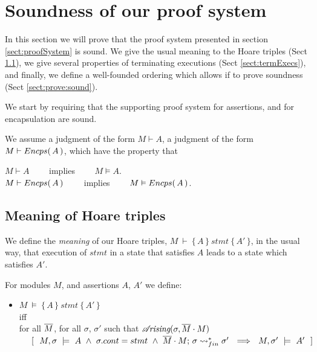 


\section{Soundness of our proof system}

In this section we will prove that the proof system presented in section \ref{sect:proofSystem} is sound. We give the usual meaning to the Hoare triples (Sect \ref{sect:HLmeans}), we give several properties of terminating executions (Sect \ref{sect:termExecs}), and finally, we define a well-founded ordering which allows if to prove soundness (Sect \ref{sect:prove:sound}).

We start by requiring  that the supporting proof system for assertions, and for encapsulation are sound.
\begin{axiom}
\label{lemma:axiom:enc:assert}
We assume a judgment of the form $M \vdash A$,  a judgment of the form $M \vdash {\ensuremath Encps(\, A\, )}$, which have the property that
\begin{center}
$M \vdash A $ \ \ \ \ implies \ \ \ \ $M \vDash A$.\\
 $M \vdash {\ensuremath Encps(\, A\, )} $ \ \ \ \ implies \ \ \ \ $M \vDash {\ensuremath Encps(\, A\, )}$.
 \end{center}
\end{axiom}

\subsection{Meaning of Hoare triples}
\label{sect:HLmeans}

We  define the {\emph {meaning}} of  our Hoare triples, $M\ \vdash\  \{\, A \,  \}\ stmt\  \{\, A' \, \}$,  in the usual way, \ie that execution of $stmt$ in a state that satisfies $A$ leads to a state which satisfies $A'$. 

 
\begin{definition}

 
For modules $M$, and assertions $A$, $A'$   we define:
\begin{itemize}
\item
$M\ \models\  \{\, A \,  \}\ stmt\  \{\, A' \, \}$ \\
iff\\
 for   all $\overline{M}$, for all $\sigma$, $\sigma'$ such that {$\mathcal{A}\!\textit{rising}(\sigma, \overline{M}\cdot M)$}\\
$\strut ~ ~ ~ ~ [ \ \ M,\sigma \ \models \ A \ \wedge\  
 \sigma.cont = stmt  \ \wedge\     \leadstoBoundedStarFin {\Mtwo\cdot M}  {\sigma}  {\sigma'}    \ \ \Longrightarrow\ \ M,\sigma' \ \models \ A'\ \ ]$
\end{itemize}
\end{definition}
 
